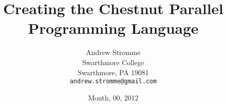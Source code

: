 \documentclass[11pt]{article}
\author{
  Andrew Stromme \\                 
  Swarthmore College \\
  Swarthmore, PA 19081 \\
  {\tt andrew.stromme@gmail.com}}
\date{Month, 00, 2012}
\begin{document}
\title{Creating the Chestnut Parallel Programming Language}


\pagestyle{empty} %
\maketitle
\clearpage\mbox{}

\renewcommand{\headrulewidth}{0pt}

\tableofcontents
\clearpage\mbox{}




\clearpage\mbox{}

\pagestyle{plain} %
\setcounter{page}{1}







\clearpage\mbox{}

\appendix
\noappendicestocpagenum
\addappheadtotoc



\end{document}

